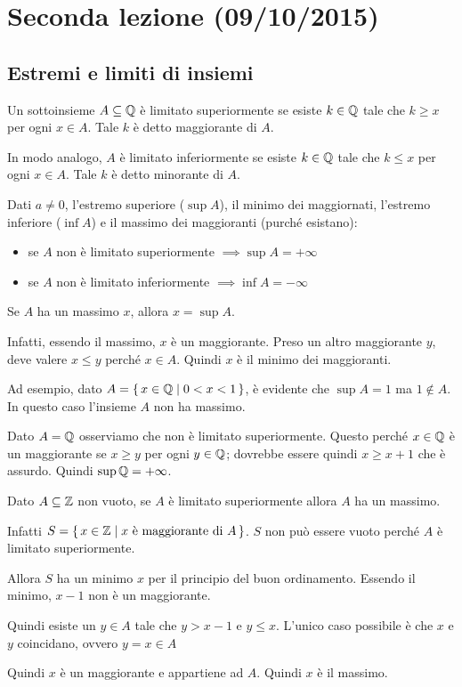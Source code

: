 \chapter{Seconda lezione (09/10/2015)}

\section{Estremi e limiti di insiemi}

\begin{definition}
Un sottoinsieme $A \subseteq \mathbb Q$ è limitato superiormente se esiste $k \in \mathbb Q$ tale che $k \ge x$ per ogni $x \in A$. Tale $k$ è detto maggiorante di $A$. 

In modo analogo, $A$ è limitato inferiormente se esiste $k \in \mathbb Q$ tale che $k \le x$ per ogni $x \in A$. Tale $k$ è detto minorante di $A$.
\end{definition}

Dati $a \neq 0$, l'estremo superiore ($\sup A$), il minimo dei maggiornati, l'estremo inferiore ($\inf A$) e il massimo dei maggioranti (purché esistano):
\begin{itemize}
\item se $A$ non è limitato superiormente $ \implies \sup A = + \infty$
\item se $A$ non è limitato inferiormente $ \implies \inf A = - \infty$
\end{itemize}

\begin{remark}
Se $A$ ha un massimo $x$, allora $x = \sup A$.

Infatti, essendo il massimo, $x$ è un maggiorante. Preso un altro maggiorante $y$, deve valere $x \le y$ perché $x \in A$. Quindi $x$ è il minimo dei maggioranti.
\end{remark}

Ad esempio, dato $A = \set{x \in \mathbb Q| 0 < x < 1}$, è evidente che $\sup A = 1$ ma $1 \notin A$. In questo caso l'insieme $A$ non ha massimo.

\begin{example}
Dato $A = \mathbb Q$ osserviamo che non è limitato superiormente. Questo perché $x \in \mathbb Q$ è un maggiorante se $x \ge y$ per ogni $y \in \mathbb Q$; dovrebbe essere quindi $x \ge x + 1$ che è assurdo. Quindi $\sup \mathbb Q = +\infty$.
\end{example}

\begin{example}
Dato $A \subseteq \mathbb Z$ non vuoto, se $A$ è limitato superiormente allora $A$ ha un massimo.

Infatti $S = \set{x \in \mathbb Z| x \text{ è maggiorante di } A}$. $S$ non può essere vuoto perché $A$ è limitato superiormente.

Allora $S$ ha un minimo $x$ per il principio del buon ordinamento. Essendo il minimo, $x-1$ non è un maggiorante.

Quindi esiste un $y \in A$ tale che $y > x-1$ e $y \le x$. L'unico caso possibile è che $x$ e $y$ coincidano, ovvero $y = x \in A$

Quindi $x$ è un maggiorante e appartiene ad $A$. Quindi $x$ è il massimo.
\end{example}

